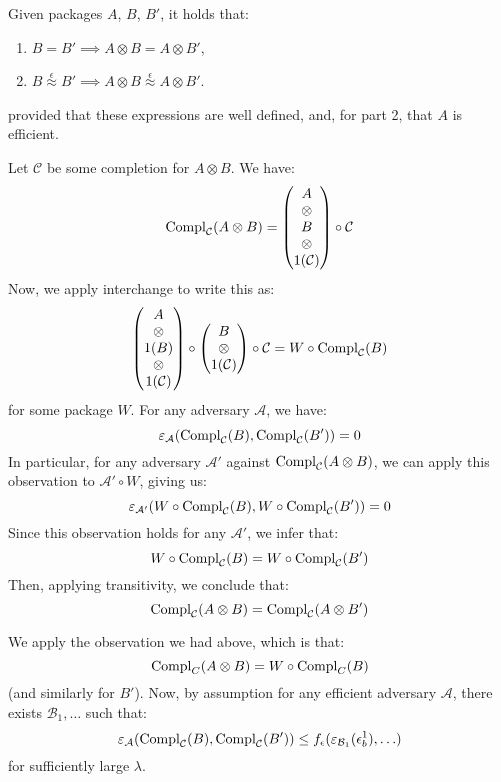 \begin{lemma}
    \label{thm:pack_tensoring_respect}
    Given packages $A$, $B$, $B'$, it holds that:
    \begin{enumerate}
        \item $B = B' \implies A \otimes B = A \otimes B'$,
        \item $B \overset{\epsilon}{\approx} B' \implies A \otimes B \overset{\epsilon}{\approx} A \otimes B'$.
    \end{enumerate}
    provided that these expressions are well defined,
    and, for part 2, that $A$ is efficient.


    Let $\mathcal{C}$ be some completion for $A \otimes B$.
    We have:
    $$
    \text{Compl}_{\mathcal{C}}(A \otimes B)
    =
    \begin{pmatrix}
        A\cr
        \otimes\cr
        B\cr
        \otimes\cr
        1(\mathcal{C})
    \end{pmatrix}
    \circ \mathcal{C}
    $$
    Now, we apply interchange to write this as:
    $$
    \begin{pmatrix}
        A\cr
        \otimes\cr
        1(B)\cr
        \otimes\cr
        1(\mathcal{C})
    \end{pmatrix}
    \circ
    \begin{pmatrix}
        B\cr
        \otimes\cr
        1(\mathcal{C})
    \end{pmatrix}
    \circ \mathcal{C}
    = W \circ \text{Compl}_{\mathcal{C}}(B)
    $$
    for some package $W$.
    For any adversary $\mathcal{A}$, we have:
    $$
    \varepsilon_{\mathcal{A}}(\text{Compl}_{\mathcal{C}}(B), \text{Compl}_{\mathcal{C}}(B')) = 0
    $$
    In particular, for any adversary $\mathcal{A}'$ against $\text{Compl}_{\mathcal{C}}(A \otimes B)$,
    we can apply this observation to $\mathcal{A}' \circ W$, giving us:
    $$
    \varepsilon_{\mathcal{A}'}(W \circ \text{Compl}_{\mathcal{C}}(B), W \circ \text{Compl}_{\mathcal{C}}(B')) = 0
    $$
    Since this observation holds for any $\mathcal{A}'$, we infer that:
    $$
    W \circ \text{Compl}_{\mathcal{C}}(B) =
    W \circ \text{Compl}_{\mathcal{C}}(B')
    $$
    Then, applying transitivity, we conclude that:
    $$
    \text{Compl}_{\mathcal{C}}(A \otimes B) =
    \text{Compl}_{\mathcal{C}}(A \otimes B')
    $$

     We apply the observation we had above, which is that:
    $$
    \text{Compl}_{C}(A \otimes B) = W \circ \text{Compl}_C(B)
    $$
    (and similarly for $B'$). 
    Now, by assumption
    for any efficient adversary $\mathcal{A}$, there exists $\mathcal{B}_1, \ldots$ such that:
    $$
    \varepsilon_{\mathcal{A}}(\text{Compl}_{\mathcal{C}}(B), \text{Compl}_{\mathcal{C}}(B')) \leq f_\epsilon(\varepsilon_{\mathcal{B}_1}(\epsilon^1_b), \ldots)
    $$
    for sufficiently large $\lambda$.


\end{lemma}
